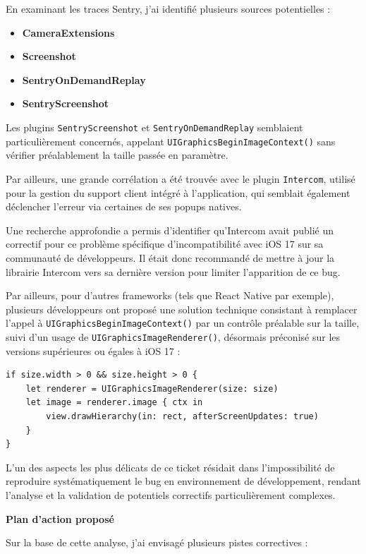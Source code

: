 \documentclass{article}
\begin{document}
En examinant les traces Sentry, j'ai identifié plusieurs sources potentielles :

\begin{itemize}
\item \textbf{CameraExtensions}
\item \textbf{Screenshot}
\item \textbf{SentryOnDemandReplay}
\item \textbf{SentryScreenshot}
\end{itemize}

Les plugins \texttt{SentryScreenshot} et \texttt{SentryOnDemandReplay} semblaient particulièrement concernés, appelant \texttt{UIGraphicsBeginImageContext()} sans vérifier préalablement la taille passée en paramètre.

Par ailleurs, une grande corrélation a été trouvée avec le plugin \texttt{Intercom}, utilisé pour la gestion du support client intégré à l'application, qui semblait également déclencher l'erreur via certaines de ses popups natives.

Une recherche approfondie a permis d'identifier qu'Intercom avait publié un correctif pour ce problème spécifique d'incompatibilité avec iOS 17 sur sa communauté de développeurs. Il était donc recommandé de mettre à jour la librairie Intercom vers sa dernière version pour limiter l'apparition de ce bug.

Par ailleurs, pour d'autres frameworks (tels que React Native par exemple), plusieurs développeurs ont proposé une solution technique consistant à remplacer l'appel à \texttt{UIGraphicsBeginImageContext()} par un contrôle préalable sur la taille, suivi d'un usage de \texttt{UIGraphicsImageRenderer()}, désormais préconisé sur les versions supérieures ou égales à iOS 17 :

\begin{verbatim}
if size.width > 0 && size.height > 0 {
    let renderer = UIGraphicsImageRenderer(size: size)
    let image = renderer.image { ctx in
        view.drawHierarchy(in: rect, afterScreenUpdates: true)
    }
}
\end{verbatim}

L'un des aspects les plus délicats de ce ticket résidait dans l'impossibilité de reproduire systématiquement le bug en environnement de développement, rendant l'analyse et la validation de potentiels correctifs particulièrement complexes.

\textbf{Plan d'action proposé}

Sur la base de cette analyse, j'ai envisagé plusieurs pistes correctives :
\end{document}
